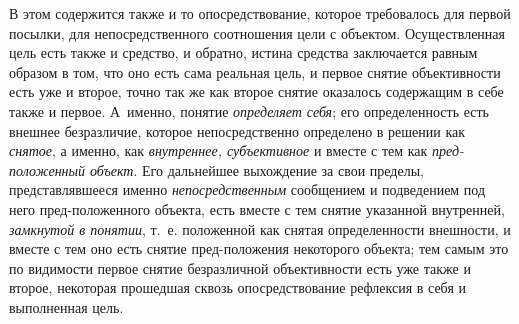 В этом содержится также и то опосредствование, которое
требовалось для первой посылки, для непосредственного соотношения цели с
объектом. Осуществленная цель есть также и средство, и обратно, истина
средства заключается равным образом в том, что оно есть сама реальная цель,
и первое снятие объективности есть уже и второе, точно так же как второе
снятие оказалось содержащим в себе также и первое. А~именно, понятие
{\em определяет себя};
его определенность есть внешнее безразличие, которое
непосредственно определено в решении как
{\em снятое}, а именно,
как {\em внутреннее, субъективное}
и вместе с тем как
{\em пред-положенный
объект}. Его дальнейшее выхождение за свои пределы,
представлявшееся именно
{\em непосредственным}
сообщением и подведением под него пред-положенного объекта,
есть вместе с тем снятие указанной внутренней,
{\em замкнутой в понятии},
т.~е. положенной как снятая определенности внешности, и
вместе с тем оно есть снятие пред-положения некоторого объекта; тем самым
это по видимости первое снятие безразличной объективности
есть уже также и второе, некоторая прошедшая сквозь опосредствование
рефлексия в себя и выполненная цель.

